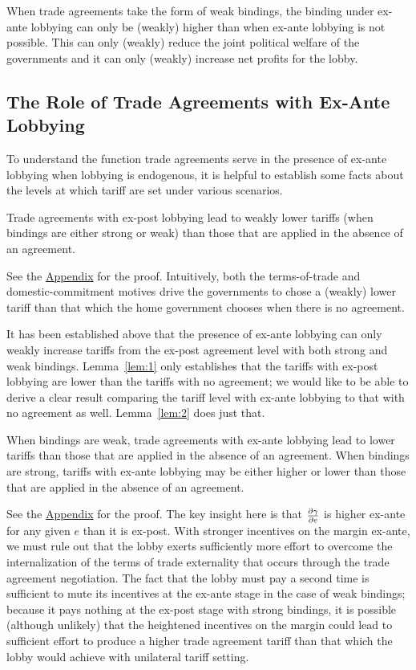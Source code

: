 \begin{result}
	When trade agreements take the form of weak bindings, the binding under ex-ante lobbying can only be (weakly) higher than when ex-ante lobbying is not possible. This can only (weakly) reduce the joint political welfare of the governments and it can only (weakly) increase net profits for the lobby.
\end{result}

\subsection{The Role of Trade Agreements with Ex-Ante Lobbying}				
To understand the function trade agreements serve in the presence of ex-ante lobbying when lobbying is endogenous, it is helpful to establish some facts about the levels at which tariff are set under various scenarios.

\begin{lemma}
  Trade agreements with ex-post lobbying lead to weakly lower tariffs (when bindings are either strong or weak) than those that are applied in the absence of an agreement.
	\label{lem:1}
\end{lemma}

See the \hyperlink{lem1}{Appendix} for the proof. Intuitively, both the terms-of-trade and domestic-commitment motives drive the governments to chose a (weakly) lower tariff than that which the home government chooses when there is no agreement.

It has been established above that the presence of ex-ante lobbying can only weakly increase tariffs from the ex-post agreement level with both strong and weak bindings. Lemma~\ref{lem:1} only establishes that the tariffs with ex-post lobbying are lower than the tariffs with no agreement; we would like to be able to derive a clear result comparing the tariff level with ex-ante lobbying to that with no agreement as well. Lemma~\ref{lem:2} does just that.

\begin{lemma}
  When bindings are weak, trade agreements with ex-ante lobbying lead to lower tariffs than those that are applied in the absence of an agreement. When bindings are strong, tariffs with ex-ante lobbying may be either higher or lower than those that are applied in the absence of an agreement.
	\label{lem:2}
\end{lemma}

See the \hyperlink{lem1}{Appendix} for the proof. The key insight here is that $\frac{\partial \gamma}{\partial e}$ is higher ex-ante for any given $e$ than it is ex-post. With stronger incentives on the margin ex-ante, we must rule out that the lobby exerts sufficiently more effort to overcome the internalization of the terms of trade externality that occurs through the trade agreement negotiation. The fact that the lobby must pay a second time is sufficient to mute its incentives at the ex-ante stage in the case of weak bindings; because it pays nothing at the ex-post stage with strong bindings, it is possible (although unlikely) that the heightened incentives on the margin could lead to sufficient effort to produce a higher trade agreement tariff than that which the lobby would achieve with unilateral tariff setting. 

